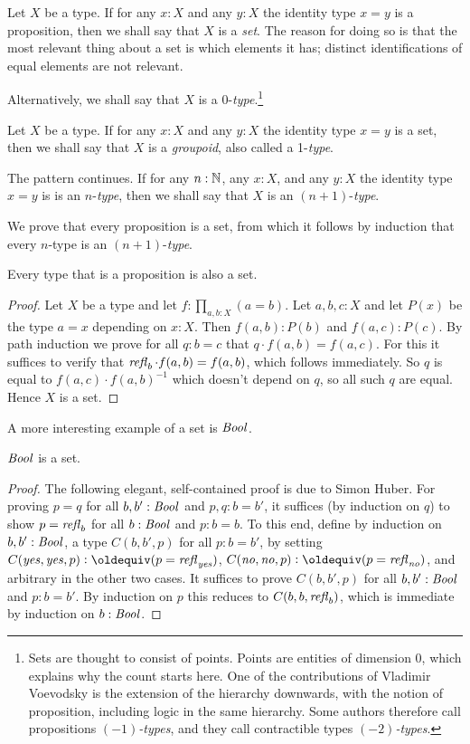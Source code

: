 Let $X$ be a type.  If for any $x:X$ and any $y:X$ the identity 
type $x=y$ is a proposition, then we shall say that $X$ is a \emph{set}.
The reason for doing so is that the most relevant
thing about a set is which elements it has; distinct identifications
of equal elements are not relevant.

Alternatively, we shall say that $X$ is a 0-\emph{type}.\footnote{%
Sets are thought to consist of points. Points are entities of dimension 0, 
which explains why the count starts here.
One of the contributions of Vladimir Voevodsky is the extension of
the hierarchy downwards, with the notion of proposition,
including logic in the same hierarchy.
Some authors therefore call propositions \emph{$(-1)$-types}, and they call contractible types {\em $(-2)$-types}.} 

Let $X$ be a type.  If for any $x:X$ and any $y:X$ the identity type $x=y$ is a set, 
 then we shall say that $X$ is a \emph{groupoid}, also called a 1-\emph{type}.

The pattern continues.  If for any $n:\mathbb{N}$, any $x:X$, and any $y:X$ 
the identity type $x=y$ is is an $n$-\emph{type}, 
then we shall say that $X$ is an $(n+1)$-\emph{type}.

We prove that every proposition is a set, from which it follows
by induction that every $n$-type is an $(n+1)$-\emph{type}.

\begin{lemma}\label{lem:prop-is-set}
Every type that is a proposition is also a set.
\end{lemma}
\begin{proof}
Let $X$ be a type and let $f: \prod_{a,b:X} (a=b)$. Let $a,b,c : X$ and
let $P(x)$ be the type $a=x$ depending on $x:X$. Then
$f(a,b):P(b)$ and $f(a,c):P(c)$. By path induction we prove for
all $q:b=c$ that $q\cdot f(a,b) = f(a,c)$. For this it suffices to
verify that $\mathop{{\it refl}_{b}} \cdot f(a,b) = f(a,b)$, which follows immediately.
So $q$ is equal to $f(a,c)\cdot f(a,b)^{-1}$ which doesn't
depend on $q$, so all such $q$ are equal. Hence $X$ is a set.
\end{proof}

A more interesting example of a set is $\mathop{\mathit{Bool}}$.

\begin{lemma}\label{lem:isset-bool}
$\mathop{\mathit{Bool}}$ is a set.
\end{lemma}
\begin{proof}
The following elegant, self-contained proof is due to Simon Huber.
For proving $p=q$ for all $b,b':\mathop{\mathit{Bool}}$ and $p,q: b=b'$,
it suffices (by induction on $q$) to show
$p=\mathop{{\it refl}_{b}}$ for all $b:\mathop{\mathit{Bool}}$ and $p: b=b$.
To this end, define by induction on $b,b':\mathop{\mathit{Bool}}$,
a type $C(b,b',p)$ for all $p: b=b'$, by setting
$C(\yes,\yes,p)\defeq (p=\refl{\yes})$,
$C(\no,\no,p)\defeq (p=\refl{\no})$,
and arbitrary in the other two cases.
It suffices to prove $C(b,b',p)$ for all $b,b':\mathop{\mathit{Bool}}$
and $p: b=b'$. By induction on $p$ this reduces to
$C(b,b,\mathop{{\it refl}_{b}})$, which is immediate by induction on $b:\mathop{\mathit{Bool}}$.
\end{proof}

